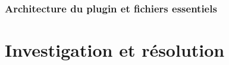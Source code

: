\subsubsection{Architecture du plugin et fichiers essentiels}



\section{Investigation et r\'{e}solution}


